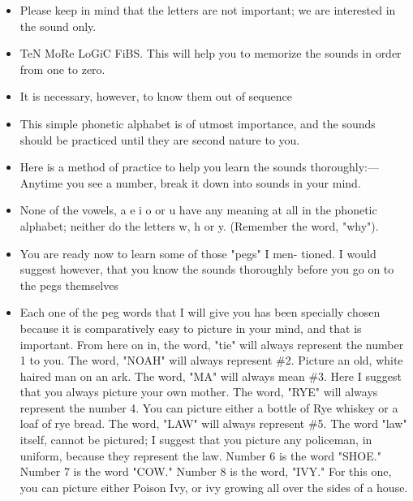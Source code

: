 \begin{itemize}
            \item Please keep in mind that the letters are not important; we are interested in the sound only.
            \item TeN
            MoRe LoGiC FiBS. This will help you to memorize the
            sounds in order from one to zero.
            \item It is necessary, however, to know them out of sequence
            \item This simple phonetic alphabet is of utmost importance,
            and the sounds should be practiced until they are second
            nature to you.
            \item Here is a method of practice to help you learn the sounds thoroughly:— Anytime you see
            a number, break it down into sounds in your mind.
            \item None of the vowels, a e i o or u have any meaning at all
            in the phonetic alphabet; neither do the letters w, h or y.
            (Remember the word, "why").
            \item You are ready now to learn some of those "pegs" I men-
            tioned. I would suggest however, that you know the sounds
            thoroughly before you go on to the pegs themselves
            \item Each one of the peg words that I will give you has
            been specially chosen because it is comparatively easy to
            picture in your mind, and that is important.
                \subitem From here on in, the word, "tie"
            will always represent the number 1 to you.
                \subitem The word, "NOAH" will always represent \#2. Picture
            an old, white haired man on an ark.
                \subitem The word, "MA" will always mean \#3. Here I suggest
            that you always picture your own mother.
                \subitem The word, "RYE" will always represent the number 4.
            You can picture either a bottle of Rye whiskey or a loaf of
            rye bread.
                \subitem The word, "LAW" will always represent \#5. The word
            "law" itself, cannot be pictured; I suggest that you picture
            any policeman, in uniform, because they represent the law.
                \subitem Number 6 is the word "SHOE."
                \subitem Number 7 is the word
            "COW."
                \subitem Number 8 is the word, "IVY." For this one, you
            can picture either Poison Ivy, or ivy growing all over the sides of a house.

\end{itemize}

